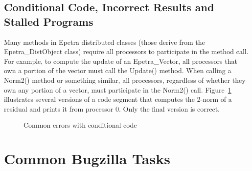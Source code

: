 \documentclass[12pt,relax]{EpetraUserGuide}
\renewcommand{\vector}{Epetra\_Vector}
\newcommand{\distobject}{Epetra\_DistObject}
\begin{document}
\subsection{Conditional Code, Incorrect Results and Stalled Programs}
Many methods in Epetra distributed classes (those derive from the
\distobject{} class) require all processors to
participate in the method call.  For example, to compute the update of
an \vector{}, all processors that own a portion of the vector must
call the Update() method.  When calling a Norm2() method or something
similar, all processors, regardless of whether they own any portion of
a vector, must participate in the Norm2() call.  
Figure~\ref{Figure:HungCode} illustrates
several versions of a code segment that computes the 2-norm of a residual
and prints it from processor 0.  Only the final version is correct.
\begin{figure}
\begin{center}

\end{center}
\caption{\label{Figure:HungCode} Common errors with conditional code}
\end{figure}

\section{Common Bugzilla Tasks}
\label{Section:Bugzilla}
\end{document}
